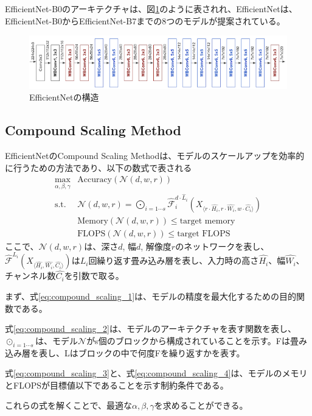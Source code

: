 \documentclass{ltjsarticle}
\begin{document}
EfficientNet-B0のアーキテクチャは、図\ref{fig:EfficientNet}のように表されれ、EfficientNetは、EfficientNet-B0からEfficientNet-B7までの8つのモデルが提案されている。
\begin{figure}
  \centering
  \includegraphics[width=15cm]{./capture/EfficientNet.png}
  \caption{EfficientNetの構造}
  \label{fig:EfficientNet}
\end{figure}


\subsection{Compound Scaling Method}
EfficientNetのCompound Scaling Methodは、モデルのスケールアップを効率的に行うための方法であり、以下の数式で表される
\begin{align}
  \label{eq:compound_scaling_1}
  \max_{\alpha, \beta, \gamma} & \text{Accuracy}(\mathcal{N}(d, w, r)) \\
  \label{eq:compound_scaling_2}
  \text{s.t. } &\mathcal{N}(d, w, r) = \bigodot_{i=1\cdots s} \hat{\mathcal{F}}_{i}^{d\cdot \hat{L}_i} (X_{\langle r\cdot \hat{H_i}, r\cdot \hat{W_i}, w\cdot \hat{C_i} \rangle })\\
  \label{eq:compound_scaling_3}
  &\text{Memory}(\mathcal{N}(d, w, r)) \leq \text{target memory}\\
  \label{eq:compound_scaling_4}
  &\text{FLOPS}(\mathcal{N}(d, w, r)) \leq \text{target FLOPS}
\end{align}
ここで、$\mathcal{N}(d, w, r)$は、深さ$d$, 幅$d$, 解像度$r$のネットワークを表し、$\hat{\mathcal{F}}^{L_i}(X_{\langle \hat{H_i}, \hat{W_i}, \hat{C_i} \rangle })$は$L_i$回繰り返す畳み込み層を表し、入力時の高さ$\hat{H_i}$、幅$\hat{W_i}$、チャンネル数$\hat{C_i}$を引数で取る。
\par
まず、式\eqref{eq:compound_scaling_1}は、モデルの精度を最大化するための目的関数である。
\par
式\eqref{eq:compound_scaling_2}は、モデルのアーキテクチャを表す関数を表し、$\odot_{i=1\cdots s}$は、モデル$\mathcal{N}$がs個のブロックから構成されていることを示す。Fは畳み込み層を表し、Lはブロックの中で何度Fを繰り返すかを表す。
\par
式\eqref{eq:compound_scaling_3}と、式\eqref{eq:compound_scaling_4}は、モデルのメモリとFLOPSが目標値以下であることを示す制約条件である。
\par
これらの式を解くことで、最適な$\alpha, \beta, \gamma$を求めることができる。
\end{document}

